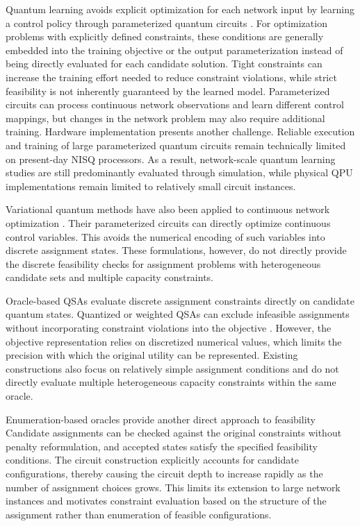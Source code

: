 \documentclass[journal]{IEEEtran}
\begin{document}
{Quantum learning avoids explicit optimization for each network input by learning a control policy through parameterized quantum circuits \cite{narottama2022qnn,ansere2024qdrl,ansere2026tnse}. 
For optimization problems with explicitly defined constraints, these conditions are generally embedded into the training objective or the output parameterization instead of being directly evaluated for each candidate solution. Tight constraints can increase the training effort needed to reduce constraint violations, while strict feasibility is not inherently guaranteed by the learned model. Parameterized circuits can process continuous network observations and learn different control mappings, but changes in the network problem may also require additional training. Hardware implementation presents another challenge. Reliable execution and training of large parameterized quantum circuits remain technically limited on present-day NISQ processors. As a result, network-scale quantum learning studies are still predominantly evaluated through simulation, while physical QPU implementations remain limited to relatively small circuit instances.

Variational quantum methods have also been applied to continuous network
optimization \cite{zhang2024beamforming,sharma2026tnse}. Their parameterized circuits can directly optimize continuous control variables. This avoids the numerical encoding of such variables into discrete
assignment states. These formulations, however, do not directly provide the discrete feasibility checks for assignment problems with heterogeneous candidate sets and multiple capacity constraints.










Oracle-based QSAs evaluate discrete assignment constraints directly on candidate quantum states. Quantized or weighted QSAs can exclude infeasible assignments without incorporating constraint violations into the objective \cite{seo2022}. However, the objective representation relies on discretized numerical values, which limits the precision with which the original utility can be represented. Existing constructions also focus on relatively simple assignment conditions and do not directly evaluate multiple heterogeneous capacity constraints within the same oracle.

Enumeration-based oracles provide another direct approach to feasibility \cite{jang2025cqf}
Candidate assignments can be checked against the original constraints without penalty reformulation, and accepted states satisfy the specified feasibility conditions. The circuit construction explicitly accounts for candidate configurations, thereby causing the circuit depth to increase rapidly as the number of assignment choices grows. This limits its extension to large network instances and motivates constraint
evaluation based on the structure of the assignment rather than enumeration of feasible configurations.

}
\end{document}
